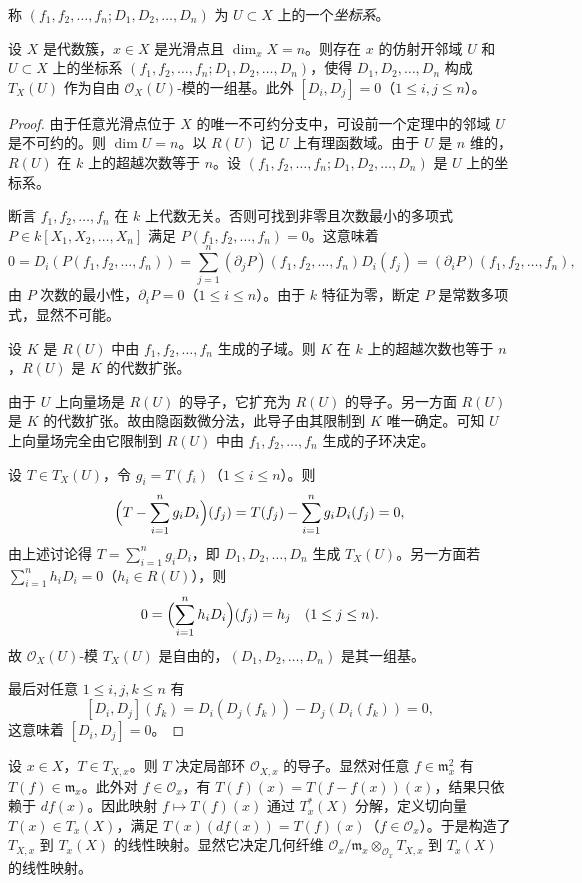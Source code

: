 称 $(f_1,f_2,\dots,f_n;D_1,D_2,\dots,D_n)$ 为 $U\subset X$ 上的一个\emph{坐标系}。

\begin{lemma}
设 $X$ 是代数簇，$x\in X$ 是光滑点且 $\dim_xX=n$。则存在 $x$ 的仿射开邻域 $U$ 和 $U\subset X$ 上的坐标系 $(f_1,f_2,\dots,f_n;D_1,D_2,\dots,D_n)$，使得 $D_1,D_2,\dots,D_n$ 构成 $T_X(U)$ 作为自由 $\mathcal{O}_X(U)$-模的一组基。此外 $[D_i,D_j]=0$（$1\le i,j\le n$）。
\end{lemma}

\begin{proof}
由于任意光滑点位于 $X$ 的唯一不可约分支中，可设前一个定理中的邻域 $U$ 是不可约的。则 $\dim U=n$。以 $R(U)$ 记 $U$ 上有理函数域。由于 $U$ 是 $n$ 维的，$R(U)$ 在 $k$ 上的超越次数等于 $n$。设 $(f_1,f_2,\dots,f_n;D_1,D_2,\dots,D_n)$ 是 $U$ 上的坐标系。

断言 $f_1,f_2,\dots,f_n$ 在 $k$ 上代数无关。否则可找到非零且次数最小的多项式 $P\in k[X_1,X_2,\dots,X_n]$ 满足 $P(f_1,f_2,\dots,f_n)=0$。这意味着
$$0=D_i(P(f_1,f_2,\dots,f_n))=\sum_{j=1}^n(\partial_jP)(f_1,f_2,\dots,f_n)D_i(f_j)=(\partial_iP)(f_1,f_2,\dots,f_n),$$
由 $P$ 次数的最小性，$\partial_iP=0$（$1\le i\le n$）。由于 $k$ 特征为零，断定 $P$ 是常数多项式，显然不可能。

设 $K$ 是 $R(U)$ 中由 $f_1,f_2,\dots,f_n$ 生成的子域。则 $K$ 在 $k$ 上的超越次数也等于 $n$，$R(U)$ 是 $K$ 的代数扩张。

由于 $U$ 上向量场是 $R(U)$ 的导子，它扩充为 $R(U)$ 的导子。另一方面 $R(U)$ 是 $K$ 的代数扩张。故由隐函数微分法，此导子由其限制到 $K$ 唯一确定。可知 $U$ 上向量场完全由它限制到 $R(U)$ 中由 $f_1,f_2,\dots,f_n$ 生成的子环决定。

设 $T\in T_X(U)$，令 $g_i=T(f_i)$（$1\le i\le n$）。则
$$\Bigl(T-\sum_{i=1}^n g_iD_i\Bigr)(f_j)=T(f_j)-\sum_{i=1}^n g_iD_i(f_j)=0,$$
由上述讨论得 $T=\sum_{i=1}^ng_iD_i$，即 $D_1,D_2,\dots,D_n$ 生成 $T_X(U)$。另一方面若 $\sum_{i=1}^nh_iD_i=0$（$h_i\in R(U)$），则
$$0=\Bigl(\sum_{i=1}^nh_iD_i\Bigr)(f_j)=h_j\quad(1\le j\le n).$$
故 $\mathcal{O}_X(U)$-模 $T_X(U)$ 是自由的，$(D_1,D_2,\dots,D_n)$ 是其一组基。

最后对任意 $1\le i,j,k\le n$ 有
$$[D_i,D_j](f_k)=D_i(D_j(f_k))-D_j(D_i(f_k))=0,$$
这意味着 $[D_i,D_j]=0$。
\end{proof}

设 $x\in X$，$T\in T_{X,x}$。则 $T$ 决定局部环 $\mathcal{O}_{X,x}$ 的导子。显然对任意 $f\in\mathfrak{m}_x^2$ 有 $T(f)\in\mathfrak{m}_x$。此外对 $f\in\mathcal{O}_x$，有 $T(f)(x)=T(f-f(x))(x)$，结果只依赖于 $df(x)$。因此映射 $f\longmapsto T(f)(x)$ 通过 $T^*_x(X)$ 分解，定义切向量 $T(x)\in T_x(X)$，满足 $T(x)(df(x))=T(f)(x)$（$f\in\mathcal{O}_x$）。于是构造了 $T_{X,x}$ 到 $T_x(X)$ 的线性映射。显然它决定几何纤维 $\mathcal{O}_x/\mathfrak{m}_x\otimes_{\mathcal{O}_x}T_{X,x}$ 到 $T_x(X)$ 的线性映射。

